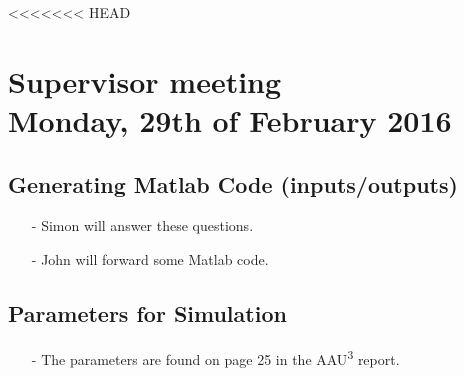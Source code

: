 

\renewcommand\chaptername{KAPITEL}
\renewcommand\contentsname{Indhold}
\renewcommand\figurename{Figur}
\renewcommand\tablename{Tabel}

<<<<<<< HEAD
\section*{Supervisor meeting\\ \small Monday, 29th of February 2016}

\subsection{Generating Matlab Code (inputs/outputs)}
\begin{itemize}
  \item[-] Simon will answer these questions.
  \item[-] John will forward some Matlab code.
\end{itemize}

\subsection{Parameters for Simulation}
\begin{itemize}
  \item[-] The parameters are found on page 25 in the \si{AAU^3} report.
\end{itemize}

